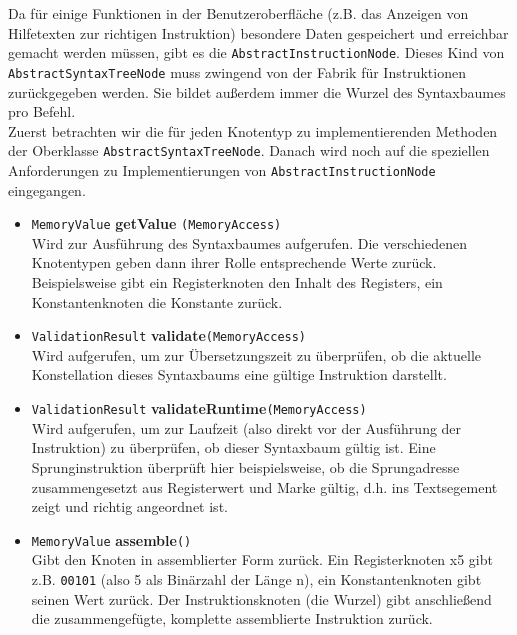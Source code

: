 Da für einige Funktionen in der Benutzeroberfläche (z.B. das Anzeigen von
Hilfetexten zur richtigen Instruktion) besondere Daten gespeichert und
erreichbar gemacht werden müssen, gibt es die \texttt{AbstractInstructionNode}.
Dieses Kind von \texttt{AbstractSyntaxTreeNode} muss zwingend von der Fabrik für
Instruktionen zurückgegeben werden. Sie bildet außerdem immer die Wurzel des
Syntaxbaumes pro Befehl.\\

Zuerst betrachten wir die für jeden Knotentyp zu implementierenden Methoden der
Oberklasse \texttt{AbstractSyntaxTreeNode}. Danach wird noch auf die speziellen
Anforderungen zu Implementierungen von \texttt{AbstractInstructionNode}
eingegangen.

\begin{itemize}

  \item \texttt{MemoryValue} \textbf{getValue} \texttt{(MemoryAccess)} \\ Wird
  zur Ausführung des Syntaxbaumes aufgerufen. Die verschiedenen Knotentypen
  geben dann ihrer Rolle entsprechende Werte zurück. Beispielsweise gibt ein
  Registerknoten den Inhalt des Registers, ein Konstantenknoten die Konstante
  zurück.

	\item \texttt{ValidationResult} \textbf{validate}\texttt{(MemoryAccess)} \\
	Wird aufgerufen, um zur Übersetzungszeit zu überprüfen, ob die aktuelle
	Konstellation dieses Syntaxbaums eine gültige Instruktion darstellt.

	\item \texttt{ValidationResult}
	\textbf{validateRuntime}\texttt{(MemoryAccess)} \\ Wird aufgerufen, um zur
	Laufzeit (also direkt vor der Ausführung der Instruktion) zu überprüfen, ob
	dieser Syntaxbaum gültig ist. Eine Sprunginstruktion überprüft hier
	beispielsweise, ob die Sprungadresse zusammengesetzt aus Registerwert und
	Marke gültig, d.h. ins Textsegement zeigt und richtig angeordnet ist.

	\item \texttt{MemoryValue} \textbf{assemble}\texttt{()} \\ Gibt den Knoten in
	assemblierter Form zurück. Ein Registerknoten x5 gibt z.B. \texttt{00101}
	(also 5 als Binärzahl der Länge n), ein Konstantenknoten gibt seinen Wert
	zurück. Der Instruktionsknoten (die Wurzel) gibt anschließend die
	zusammengefügte, komplette assemblierte Instruktion zurück.

\end{itemize}

